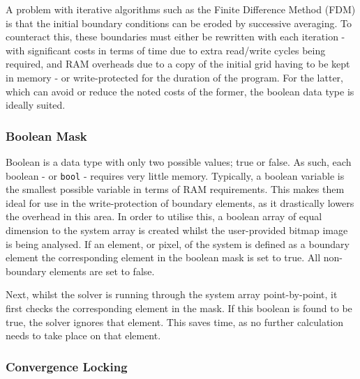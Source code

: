		A problem with iterative algorithms such as the Finite Difference Method (FDM) is that the initial boundary conditions can be eroded by successive averaging. To counteract this, these boundaries must either be rewritten with each iteration - with significant costs in terms of time due to extra read/write cycles being required, and RAM overheads due to a copy of the initial grid having to be kept in memory - or write-protected for the duration of the program. For the latter, which can avoid or reduce the noted costs of the former, the boolean data type is ideally suited.
		
		\subsubsection{Boolean Mask}
		
		Boolean is a data type with only two possible values; true or false. As such, each boolean - or \lstinline|bool| - requires very little memory. Typically, a boolean variable is the smallest possible variable in terms of RAM requirements. This makes them ideal for use in the write-protection of boundary elements, as it drastically lowers the overhead in this area. In order to utilise this, a boolean array of equal dimension to the system array is created whilst the user-provided bitmap image is being analysed. If an element, or pixel, of the system is defined as a boundary element the corresponding element in the boolean mask is set to true. All non-boundary elements are set to false.
		
		Next, whilst the solver is running through the system array point-by-point, it first checks the corresponding element in the mask. If this boolean is found to be true, the solver ignores that element. This saves time, as no further calculation needs to take place on that element.
	
		\subsubsection{Convergence Locking}
		
